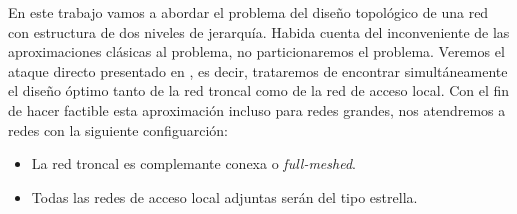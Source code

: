 \documentclass[twoside,12pt]{article}
\begin{document}
En este trabajo vamos a abordar el problema del diseño topológico de una red con estructura de dos niveles de jerarquía. Habida cuenta del inconveniente de las aproximaciones clásicas al problema, no particionaremos el problema. Veremos el ataque directo presentado en \cite{paper}, es decir, trataremos de encontrar simultáneamente el diseño óptimo tanto de la red troncal como de la red de acceso local. Con el fin de hacer factible esta aproximación incluso para redes grandes, nos atendremos a redes con la siguiente configuarción:

\begin{itemize}
\item La red troncal es complemante conexa o \textit{full-meshed}.
\item Todas las redes de acceso local adjuntas serán del tipo estrella. 
\end{itemize}
\end{document}
